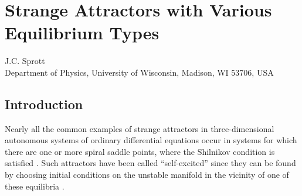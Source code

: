\chapter{Strange Attractors with Various Equilibrium Types}

\begin{pauthor}
  J.C. Sprott\\
  Department of Physics, University of Wisconsin, Madison, WI 53706, USA\\
\end{pauthor}


\section{Introduction}
Nearly all the common examples of strange attractors in three-dimensional autonomous
systems of ordinary differential equations occur in systems for which there
are one or more spiral saddle points, where the Shilnikov condition is satisfied \cite{01Shilnikov1998Methods}. Such
attractors have been called “self-excited” since they can be found by choosing initial
conditions on the unstable manifold in the vicinity of one of these equilibria \cite{02Leonov2011Localization,03Leonov2012IWCFTA2012}.

